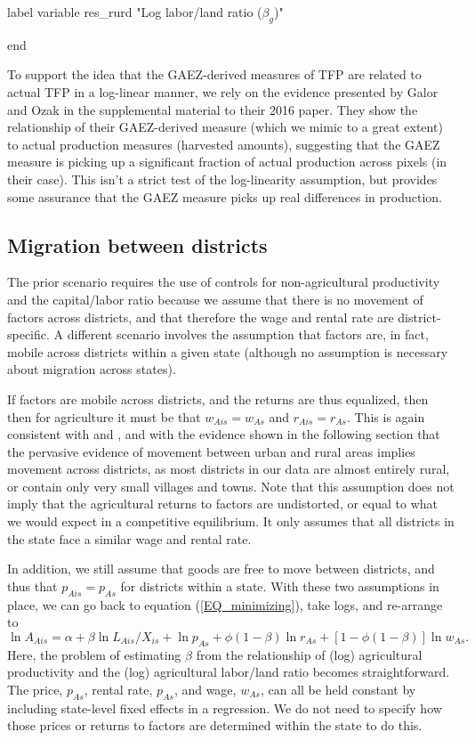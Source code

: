 	label variable res_rurd "Log labor/land ratio ($\beta_g$)"


end 


To support the idea that the GAEZ-derived measures of TFP are related to actual TFP in a log-linear manner, we rely on the evidence presented by Galor and Ozak in the supplemental material to their 2016 paper. They show the relationship of their GAEZ-derived measure (which we mimic to a great extent) to actual production measures (harvested amounts), suggesting that the GAEZ measure is picking up a significant fraction of actual production across pixels (in their case). This isn't a strict test of the log-linearity assumption, but provides some assurance that the GAEZ measure picks up real differences in production.
\subsection{Migration between districts}
The prior scenario requires the use of controls for non-agricultural productivity and the capital/labor ratio because we assume that there is no movement of factors across districts, and that therefore the wage and rental rate are district-specific. A different scenario involves the assumption that factors are, in fact, mobile across districts within a given state (although no assumption is necessary about migration across states).

If factors are mobile across districts, and the returns are thus equalized, then 
then for agriculture it must be that $w_{Ais} = w_{As}$ and $r_{Ais} = r_{As}$. This is again consistent with \citet{young2013inequality} and \citet{hklm2017}, and with the evidence shown in the following section that the pervasive evidence of movement between urban and rural areas implies movement across districts, as most districts in our data are almost entirely rural, or contain only very small villages and towns. Note that this assumption does not imply that the agricultural returns to factors are undistorted, or equal to what we would expect in a competitive equilibrium. It only assumes that all districts in the state face a similar wage and rental rate.

In addition, we still assume that goods are free to move between districts, and thus that $p_{Ais} = p_{As}$ for districts within a state. With these two assumptions in place, we can go back to equation (\ref{EQ_minimizing}), take logs, and re-arrange to
\begin{equation*}
	\ln A_{Ais} = \alpha + \beta \ln L_{Ais}/X_{is} + \ln p_{As} + \phi(1-\beta)\ln r_{As} + \left[1-\phi(1-\beta)\right] \ln w_{As}.
\end{equation*}
Here, the problem of estimating $\beta$ from the relationship of (log) agricultural productivity and the (log) agricultural labor/land ratio becomes straightforward. The price, $p_{As}$, rental rate, $p_{As}$, and wage, $w_{As}$, can all be held constant by including state-level fixed effects in a regression. We do not need to specify how those prices or returns to factors are determined within the state to do this.



